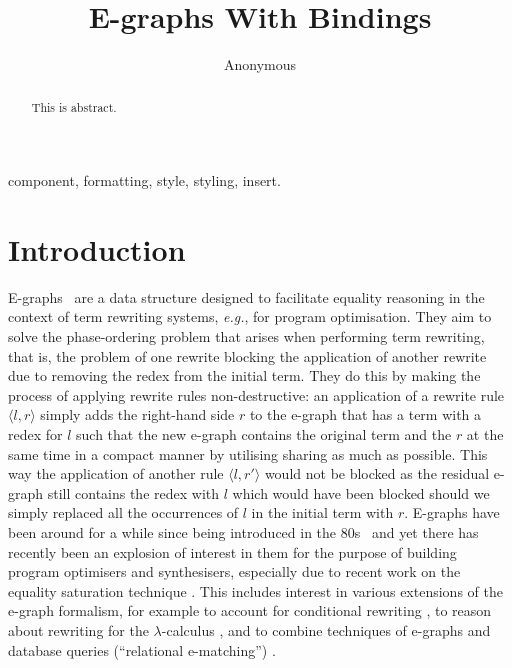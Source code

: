 \documentclass[peerreviewcls]{IEEEtran}
\begin{document}
\title{E-graphs With Bindings
}


\author{Anonymous}

\maketitle

\begin{abstract}
This is abstract.
\end{abstract}

\begin{IEEEkeywords}
component, formatting, style, styling, insert.
\end{IEEEkeywords}

\section{Introduction}
E-graphs~\cite{EggPaper} are a data structure designed to facilitate equality reasoning in the context of term rewriting systems, \textit{e.g.}, for program optimisation.
They aim to solve the phase-ordering problem that arises when performing term rewriting, that is, the problem of one rewrite blocking the application of another rewrite due to removing the redex from the initial term.
They do this by making the process of applying rewrite rules non-destructive: an application of a rewrite rule $\langle l, r \rangle$ simply adds the right-hand side $r$ to the e-graph that has a term with a redex for $l$ such that the new e-graph contains the original term and the $r$ at the same time in a compact manner by utilising sharing as much as possible.
This way the application of another rule $\langle l, r' \rangle$ would not be blocked as the residual e-graph still contains the redex with $l$ which would have been blocked should we simply replaced all the occurrences of $l$ in the initial term with $r$.
E-graphs have been around for a while since being introduced in the 80s~\cite{nelson1980techniques} and yet there has recently been an explosion of interest in them for the purpose of building program optimisers and synthesisers, especially due to recent work on the equality saturation technique \cite{10.1145/1594834.1480915, griggio_proceedings_2022, EggPaper,flatt_small_2022}.
This includes interest in various extensions of the e-graph formalism, for example to account for conditional rewriting \cite{singher2023colored},  to reason about rewriting for the $\lambda$-calculus \cite{koehler2022sketchguided},  and to combine techniques of e-graphs and database queries (``relational e-matching'') \cite{zhang_relational_2022}.
\end{document}
